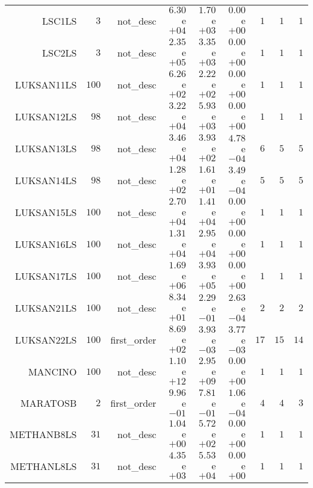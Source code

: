 \begin{longtable}{rrrrrrrrr}
LSC1LS & \(     3\) & not\_desc & \( 6.30\)e\(+04\) & \( 1.70\)e\(+03\) & \( 0.00\)e\(+00\) & \(     1\) & \(     1\) & \(     1\) \\
LSC2LS & \(     3\) & not\_desc & \( 2.35\)e\(+05\) & \( 3.35\)e\(+03\) & \( 0.00\)e\(+00\) & \(     1\) & \(     1\) & \(     1\) \\
LUKSAN11LS & \(   100\) & not\_desc & \( 6.26\)e\(+02\) & \( 2.22\)e\(+02\) & \( 0.00\)e\(+00\) & \(     1\) & \(     1\) & \(     1\) \\
LUKSAN12LS & \(    98\) & not\_desc & \( 3.22\)e\(+04\) & \( 5.93\)e\(+03\) & \( 0.00\)e\(+00\) & \(     1\) & \(     1\) & \(     1\) \\
LUKSAN13LS & \(    98\) & not\_desc & \( 3.46\)e\(+04\) & \( 3.93\)e\(+02\) & \( 4.78\)e\(-04\) & \(     6\) & \(     5\) & \(     5\) \\
LUKSAN14LS & \(    98\) & not\_desc & \( 1.28\)e\(+02\) & \( 1.61\)e\(+01\) & \( 3.49\)e\(-04\) & \(     5\) & \(     5\) & \(     5\) \\
LUKSAN15LS & \(   100\) & not\_desc & \( 2.70\)e\(+04\) & \( 1.41\)e\(+04\) & \( 0.00\)e\(+00\) & \(     1\) & \(     1\) & \(     1\) \\
LUKSAN16LS & \(   100\) & not\_desc & \( 1.31\)e\(+04\) & \( 2.95\)e\(+04\) & \( 0.00\)e\(+00\) & \(     1\) & \(     1\) & \(     1\) \\
LUKSAN17LS & \(   100\) & not\_desc & \( 1.69\)e\(+06\) & \( 3.93\)e\(+05\) & \( 0.00\)e\(+00\) & \(     1\) & \(     1\) & \(     1\) \\
LUKSAN21LS & \(   100\) & not\_desc & \( 8.34\)e\(+01\) & \( 2.29\)e\(-01\) & \( 2.63\)e\(-04\) & \(     2\) & \(     2\) & \(     2\) \\
LUKSAN22LS & \(   100\) & first\_order & \( 8.69\)e\(+02\) & \( 3.93\)e\(-03\) & \( 3.77\)e\(-03\) & \(    17\) & \(    15\) & \(    14\) \\
MANCINO & \(   100\) & not\_desc & \( 1.10\)e\(+12\) & \( 2.95\)e\(+09\) & \( 0.00\)e\(+00\) & \(     1\) & \(     1\) & \(     1\) \\
MARATOSB & \(     2\) & first\_order & \( 9.96\)e\(-01\) & \( 7.81\)e\(-01\) & \( 1.06\)e\(-04\) & \(     4\) & \(     4\) & \(     3\) \\
METHANB8LS & \(    31\) & not\_desc & \( 1.04\)e\(+00\) & \( 5.72\)e\(+02\) & \( 0.00\)e\(+00\) & \(     1\) & \(     1\) & \(     1\) \\
METHANL8LS & \(    31\) & not\_desc & \( 4.35\)e\(+03\) & \( 5.53\)e\(+04\) & \( 0.00\)e\(+00\) & \(     1\) & \(     1\) & \(     1\) \\

\end{longtable}
